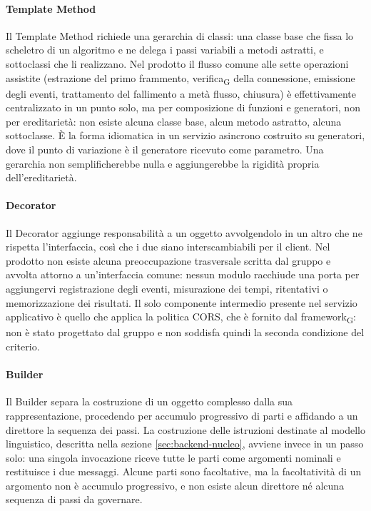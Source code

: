 \documentclass[a4paper, 10pt]{article}
\begin{document}
\paragraph{Template Method}
Il Template Method richiede una gerarchia di classi: una classe base che fissa lo scheletro di un algoritmo e ne delega i passi variabili a metodi astratti, e sottoclassi che li realizzano. Nel prodotto il flusso comune alle sette operazioni assistite (estrazione del primo frammento, verifica\textsubscript{G} della connessione, emissione degli eventi, trattamento del fallimento a metà flusso, chiusura) è effettivamente centralizzato in un punto solo, ma per composizione di funzioni e generatori, non per ereditarietà: non esiste alcuna classe base, alcun metodo astratto, alcuna sottoclasse. È la forma idiomatica in un servizio asincrono costruito su generatori, dove il punto di variazione è il generatore ricevuto come parametro. Una gerarchia non semplificherebbe nulla e aggiungerebbe la rigidità propria dell'ereditarietà.

\paragraph{Decorator}
Il Decorator aggiunge responsabilità a un oggetto avvolgendolo in un altro che ne rispetta l'interfaccia, così che i due siano interscambiabili per il client. Nel prodotto non esiste alcuna preoccupazione trasversale scritta dal gruppo e avvolta attorno a un'interfaccia comune: nessun modulo racchiude una porta per aggiungervi registrazione degli eventi, misurazione dei tempi, ritentativi o memorizzazione dei risultati. Il solo componente intermedio presente nel servizio applicativo è quello che applica la politica CORS, che è fornito dal framework\textsubscript{G}: non è stato progettato dal gruppo e non soddisfa quindi la seconda condizione del criterio.

\paragraph{Builder}
Il Builder separa la costruzione di un oggetto complesso dalla sua rappresentazione, procedendo per accumulo progressivo di parti e affidando a un direttore la sequenza dei passi. La costruzione delle istruzioni destinate al modello linguistico, descritta nella sezione \ref{sec:backend-nucleo}, avviene invece in un passo solo: una singola invocazione riceve tutte le parti come argomenti nominali e restituisce i due messaggi. Alcune parti sono facoltative, ma la facoltatività di un argomento non è accumulo progressivo, e non esiste alcun direttore né alcuna sequenza di passi da governare.
\end{document}
